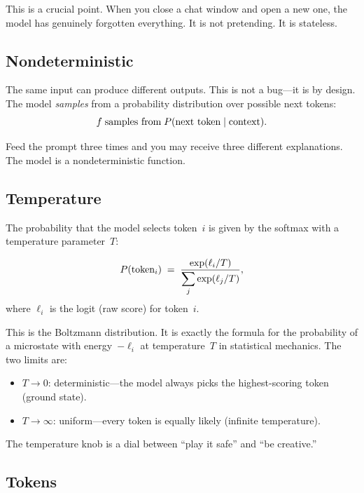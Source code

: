This is a crucial point.  When you close a chat window and open a new
one, the model has genuinely forgotten everything.  It is not pretending.
It is stateless.

\subsection{Nondeterministic}

The same input can produce different outputs.  This is not a bug---it is
by design.  The model \emph{samples} from a probability distribution
over possible next tokens:
\[
  f \;\text{samples from}\; P(\text{next token} \mid \text{context}).
\]

Feed the prompt  three times and you may receive
three different explanations.  The model is a nondeterministic function.

\subsection{Temperature}\label{subsec:temperature}

The probability that the model selects token~$i$ is given by the
softmax with a temperature parameter~$T$:

\begin{keyresult}
  \[
    P(\text{token}_i) \;=\; \frac{\exp(\ell_i / T)}
      {\displaystyle\sum_j \exp(\ell_j / T)},
  \]
  where $\ell_i$ is the logit (raw score) for token~$i$.
\end{keyresult}

\begin{intuition}
  This is the Boltzmann distribution.  It is exactly the formula for the
  probability of a microstate with energy~$-\ell_i$ at temperature~$T$
  in statistical mechanics.  The two limits are:
  \begin{itemize}
    \item $T \to 0$: deterministic---the model always picks the
      highest-scoring token (ground state).
    \item $T \to \infty$: uniform---every token is equally likely
      (infinite temperature).
  \end{itemize}
  The temperature knob is a dial between ``play it safe'' and
  ``be creative.''
\end{intuition}

\subsection{Tokens}

